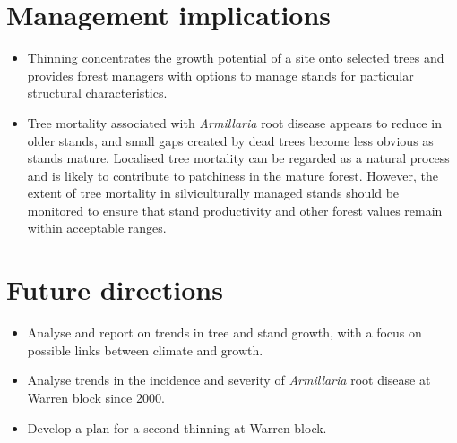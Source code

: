 \documentclass[version=last, paper=a4, DIV=18, usenames, dvipsnames]{scrartcl}
\begin{document}
\section{Management implications}



\begin{itemize}

  \item Thinning concentrates the growth potential of a site onto selected trees and provides forest managers with options to manage stands for particular structural characteristics.

  \item Tree mortality associated with \emph{Armillaria} root disease appears to reduce in older stands, and small gaps created by dead trees become less obvious as stands mature. Localised tree mortality can be regarded as a natural process and is likely to contribute to patchiness in the mature forest. However, the extent of tree mortality in silviculturally managed stands should be monitored to ensure that stand productivity and other forest values remain within acceptable ranges.

\end{itemize}






\section{Future directions}



\begin{itemize}

  \item Analyse and report on trends in tree and stand growth, with a focus on possible links between climate and growth.

  \item Analyse trends in the incidence and severity of \emph{Armillaria} root disease at Warren block since 2000.

  \item Develop a plan for a second thinning at Warren block.

\end{itemize}






\clearpage
\end{document}
